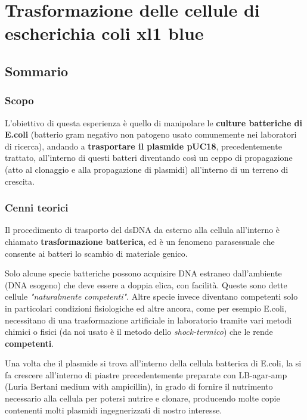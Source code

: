 \chapter{Trasformazione delle cellule di escherichia coli xl1 blue}

\vspace{0.6cm}

\section{Sommario}

\subsection{Scopo}

L'obiettivo di questa esperienza è quello di manipolare le \textbf{culture batteriche di E.coli}
(batterio gram negativo non patogeno usato comunemente nei laboratori di ricerca),
andando a \textbf{trasportare il plasmide pUC18}, precedentemente trattato,
all'interno di questi batteri diventando cos\`i un ceppo di propagazione
(atto al clonaggio e alla propagazione di plasmidi) all'interno di un terreno di crescita.

\subsection{Cenni teorici}

Il procedimento di trasporto del dsDNA da esterno alla cellula all'interno è chiamato
\textbf{trasformazione batterica}, ed è un fenomeno parasessuale che consente ai batteri
lo scambio di materiale genico.

Solo alcune specie batteriche possono acquisire DNA estraneo dall'ambiente (DNA esogeno)
che deve essere a doppia elica, con facilità.
Queste sono dette cellule \textit{"naturalmente competenti"}.
Altre specie invece diventano competenti solo in particolari condizioni fisiologiche
ed altre ancora, come per esempio E.coli, necessitano di una trasformazione artificiale in
laboratorio tramite vari metodi chimici o fisici
(da noi usato è il metodo dello \textit{shock-termico}) che le rende \textbf{competenti}.

Una volta che il plasmide si trova all'interno della cellula batterica di E.coli,
la si fa crescere all'interno di piastre precedentemente preparate con LB-agar-amp
(Luria Bertani medium with ampicillin), in grado di fornire il nutrimento necessario
alla cellula per potersi nutrire e clonare,
producendo molte copie contenenti molti plasmidi ingegnerizzati di nostro interesse.

